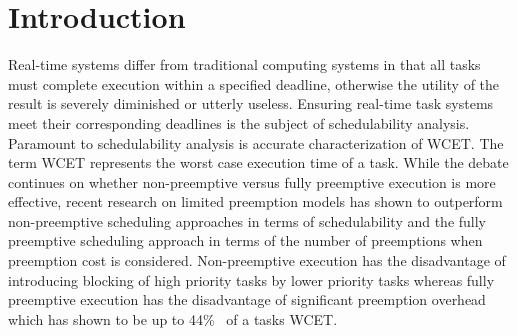 \vspace{-10pt}
\section{Introduction}\label{sec:introduction}

Real-time systems differ from traditional computing systems in that all tasks must complete execution within a specified deadline, otherwise the utility of the result is severely diminished or utterly useless.  Ensuring real-time task systems meet their corresponding deadlines is the subject of schedulability analysis.  Paramount to schedulability analysis is accurate characterization of WCET.  The term WCET represents the worst case execution time of a task.  While the debate continues on whether non-preemptive versus fully preemptive execution is more effective, recent research on limited preemption models has shown to outperform non-preemptive scheduling approaches in terms of schedulability and the fully preemptive scheduling approach in terms of the number of preemptions when preemption cost is considered.  Non-preemptive execution has the disadvantage of introducing blocking of high priority tasks by lower priority tasks whereas fully preemptive execution has the disadvantage of significant preemption overhead which has shown to be up to 44\%~\cite{pellizzoni:07,pellizzoni:08,pellizzoni:11} of a tasks WCET.

